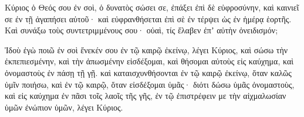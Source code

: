{Κύριος ὁ Θεός σου ἐν σοὶ, ὁ δυνατὸς σώσει σε, ἐπάξει ἐπὶ δὲ εὐφροσύνην, καὶ καινιεῖ σε ἐν τῇ ἀγαπήσει αὐτοῦ· καὶ εὐφρανθήσεται ἐπὶ σὲ ἐν τέρψει ὡς ἐν ἡμέρᾳ ἑορτῆς.
Καὶ συνάξω τοὺς συντετριμμένους σου· οὐαὶ, τίς ἔλαβεν ἐπʼ αὐτὴν ὀνειδισμόν;
\par }{\PP {}Ἰδοὺ ἐγὼ ποιῶ ἐν σοὶ ἔνεκέν σου ἐν τῷ καιρῷ ἐκείνῳ, λέγει Κύριος, καὶ σώσω τὴν ἐκπεπιεσμένην, καὶ τὴν ἀπωσμένην εἰσδέξομαι, καὶ θήσομαι αὐτοὺς εἰς καύχημα, καὶ ὀνομαστοὺς ἐν πάσῃ τῇ γῇ.
καὶ καταισχυνθήσονται ἐν τῷ καιρῷ ἐκείνῳ, ὅταν καλῶς ὑμῖν ποιήσω, καὶ ἐν τῷ καιρῷ, ὅταν εἰσδέξομαι ὑμᾶς· διότι δώσω ὑμᾶς ὀνομαστοὺς, καὶ εἰς καύχημα ἐν πᾶσι τοῖς λαοῖς τῆς γῆς, ἐν τῷ ἐπιστρέφειν με τὴν αἰχμαλωσίαν ὑμῶν ἐνώπιον ὑμῶν, λέγει Κύριος.
\par }